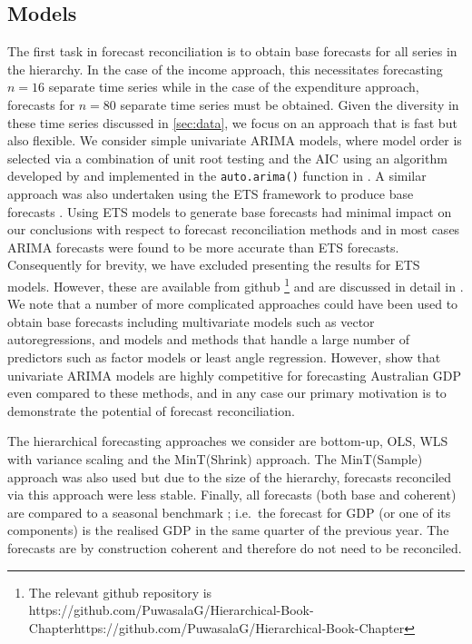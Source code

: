 {\subsection{Models}

The first task in forecast reconciliation is to obtain base forecasts for all series in the hierarchy. In the case of the income approach, this necessitates forecasting $n=16$ separate time series while in the case of the expenditure approach, forecasts for $n=80$ separate time series must be obtained. Given the diversity in these time series discussed in \ref{sec:data}, we focus on an approach that is fast but also flexible. We consider simple univariate ARIMA models, where model order is selected via a combination of unit root testing and the AIC using an algorithm developed by \citet{HK08} and implemented in the \verb|auto.arima()| function in \citet{Rforecast}. A similar approach was also undertaken using the ETS framework to produce base forecasts \citep{expsmooth08}. Using ETS models to generate base forecasts had minimal impact on our conclusions with respect to forecast reconciliation methods and in most cases ARIMA forecasts were found to be more accurate than ETS forecasts. Consequently for brevity, we have excluded presenting the results for ETS models. However, these are available from github \footnote {The relevant github repository is {https://github.com/PuwasalaG/Hierarchical-Book-Chapter}{https://github.com/PuwasalaG/Hierarchical-Book-Chapter}} and are discussed in detail in \cite{gamakumara2019phd}. We note that a number of more complicated approaches could have been used to obtain base forecasts including multivariate models such as vector autoregressions, and models and methods that handle a large number of predictors such as factor models or least angle regression. However, \citet{PanEtAl2019} show that univariate ARIMA models are highly competitive for forecasting Australian GDP even compared to these methods, and in any case our primary motivation is to demonstrate the potential of forecast reconciliation.

The hierarchical forecasting approaches we consider are bottom-up, OLS, WLS with variance scaling and the MinT(Shrink) approach. The MinT(Sample) approach was also used but due to the size of the hierarchy, forecasts reconciled via this approach were less stable. Finally, all forecasts (both base and coherent) are compared to a seasonal \naive benchmark \citep{HynAth2018}; i.e.\ the forecast for GDP (or one of its components) is the realised GDP in the same quarter of the previous year. The \naive forecasts are by construction coherent and therefore do not need to be reconciled.

}
